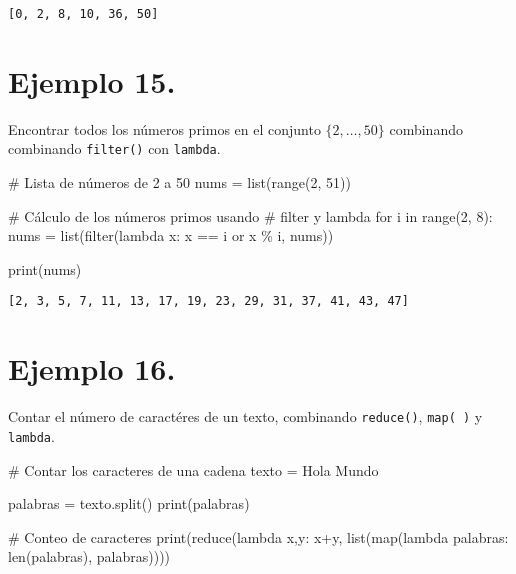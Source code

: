 \documentclass[
  letterpaper,
  DIV=11,
  numbers=noendperiod]{scrreprt}
\newenvironment{Shaded}{\begin{snugshade}}{\end{snugshade}}
\newcommand{\BuiltInTok}[1]{\textcolor[rgb]{0.00,0.23,0.31}{#1}}
\newcommand{\CommentTok}[1]{\textcolor[rgb]{0.37,0.37,0.37}{#1}}
\newcommand{\ControlFlowTok}[1]{\textcolor[rgb]{0.00,0.23,0.31}{#1}}
\newcommand{\DecValTok}[1]{\textcolor[rgb]{0.68,0.00,0.00}{#1}}
\newcommand{\KeywordTok}[1]{\textcolor[rgb]{0.00,0.23,0.31}{#1}}
\newcommand{\NormalTok}[1]{\textcolor[rgb]{0.00,0.23,0.31}{#1}}
\newcommand{\OperatorTok}[1]{\textcolor[rgb]{0.37,0.37,0.37}{#1}}
\newcommand{\StringTok}[1]{\textcolor[rgb]{0.13,0.47,0.30}{#1}}
\begin{document}
\begin{verbatim}
[0, 2, 8, 10, 36, 50]
\end{verbatim}

\section{\texorpdfstring{\textbf{Ejemplo
15.}}{Ejemplo 15.}}\label{ejemplo-15.}

Encontrar todos los números primos en el conjunto \(\{2, \dots, 50\}\)
combinando combinando \texttt{filter()} con \texttt{lambda}.

\begin{Shaded}
\begin{Highlighting}[]
\CommentTok{\# Lista de números de 2 a 50}
\NormalTok{nums }\OperatorTok{=} \BuiltInTok{list}\NormalTok{(}\BuiltInTok{range}\NormalTok{(}\DecValTok{2}\NormalTok{, }\DecValTok{51}\NormalTok{)) }

\CommentTok{\# Cálculo de los números primos usando}
\CommentTok{\# filter y lambda}
\ControlFlowTok{for}\NormalTok{ i }\KeywordTok{in} \BuiltInTok{range}\NormalTok{(}\DecValTok{2}\NormalTok{, }\DecValTok{8}\NormalTok{):}
\NormalTok{    nums }\OperatorTok{=} \BuiltInTok{list}\NormalTok{(}\BuiltInTok{filter}\NormalTok{(}\KeywordTok{lambda}\NormalTok{ x: x }\OperatorTok{==}\NormalTok{ i }\KeywordTok{or}\NormalTok{ x }\OperatorTok{\%}\NormalTok{ i, nums))}

\BuiltInTok{print}\NormalTok{(nums)}
\end{Highlighting}
\end{Shaded}

\begin{verbatim}
[2, 3, 5, 7, 11, 13, 17, 19, 23, 29, 31, 37, 41, 43, 47]
\end{verbatim}

\section{\texorpdfstring{\textbf{Ejemplo
16.}}{Ejemplo 16.}}\label{ejemplo-16.}

Contar el número de caractéres de un texto, combinando
\texttt{reduce()}, \texttt{map(\ )} y \texttt{lambda}.

\begin{Shaded}
\begin{Highlighting}[]
\CommentTok{\# Contar los caracteres de una cadena}
\NormalTok{texto }\OperatorTok{=} \StringTok{\textquotesingle{}Hola Mundo\textquotesingle{}}

\NormalTok{palabras }\OperatorTok{=}\NormalTok{ texto.split()}
\BuiltInTok{print}\NormalTok{(palabras)}

\CommentTok{\# Conteo de caracteres}
\BuiltInTok{print}\NormalTok{(}\BuiltInTok{reduce}\NormalTok{(}\KeywordTok{lambda}\NormalTok{ x,y: x}\OperatorTok{+}\NormalTok{y, }\BuiltInTok{list}\NormalTok{(}\BuiltInTok{map}\NormalTok{(}\KeywordTok{lambda}\NormalTok{ palabras: }\BuiltInTok{len}\NormalTok{(palabras), palabras))))}
\end{Highlighting}
\end{Shaded}
\end{document}
